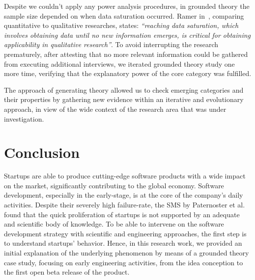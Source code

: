 \documentclass[10pt,journal,letterpaper,compsoc]{IEEEtran}
\begin{document}
Despite we couldn't apply any power analysis procedures, in grounded theory the
sample size depended on when data saturation occurred. Ramer in~\cite{Ramer},
comparing quantitative to qualitative researches, states: \textit{``reaching
data saturation, which involves obtaining data until no new information emerges,
is critical for obtaining applicability in qualitative research''}. To avoid
interrupting the research prematurely, after attesting that no more relevant
information could be gathered from executing additional interviews, we iterated
grounded theory study one more time, verifying that the explanatory power of the
core category was fulfilled.

The approach of generating theory allowed us to check emerging categories and
their properties by gathering new evidence within an iterative and evolutionary
approach, in view of the wide context of the research area that was under
investigation.



\section{Conclusion} \label{conc} 
Startups are able to produce cutting-edge software products with a wide impact 
on the market, significantly contributing to the global economy. Software 
development, especially in the early-stage, is at the core of the company's 
daily activities. Despite their severely high failure-rate, the SMS 
by Paternoster et al.~\cite{SMS} found that the quick proliferation of startups 
is not supported by an adequate and scientific body of knowledge. 
To be able to intervene on the software development strategy with scientific and 
engineering approaches, the first step is to understand startups' behavior. 
Hence, in this research work, we provided an initial explanation of the 
underlying phenomenon by means of a grounded theory case study, focusing on 
early engineering activities, from the idea conception to the first open beta 
release of the product.
\end{document}
